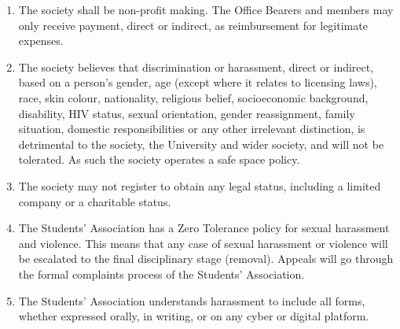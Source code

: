 \begin{enumerate}
\item The society shall be non-profit making. The Office Bearers and members may only receive payment, direct or indirect, as reimbursement for legitimate expenses.

\item The society believes that discrimination or harassment, direct or indirect, based on a person's gender, age (except where it relates to licensing laws), race, skin colour, nationality, religious belief, socioeconomic background, disability, HIV status, sexual orientation, gender reassignment, family situation, domestic responsibilities or any other irrelevant distinction, is detrimental to the society, the University and wider society, and will not be tolerated. As such the society operates a safe space policy.

\item The society may not register to obtain any legal status, including a limited company or a charitable status.

\item The Students' Association has a Zero Tolerance policy for sexual harassment and violence. This means that any case of sexual harassment or violence will be escalated to the final disciplinary stage (removal). Appeals will go through the formal complaints process of the Students' Association.

\item The Students' Association understands harassment to include all forms, whether expressed orally, in writing, or on any cyber or digital platform.


\end{enumerate}
